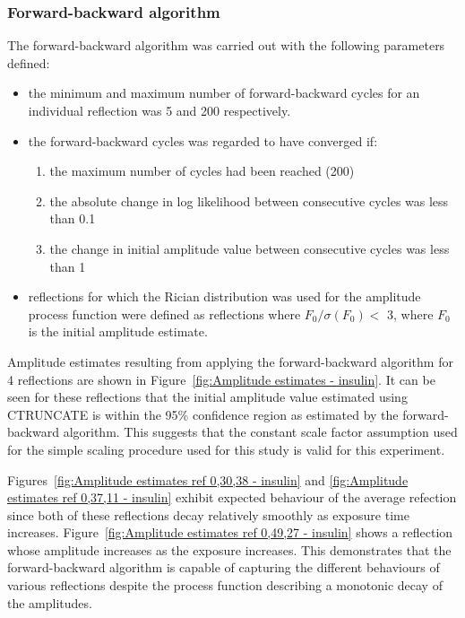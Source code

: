 \subsubsection{Forward-backward algorithm}
\label{subs:Forward-backward algorithm - insulin}
The forward-backward algorithm was carried out with the following parameters defined:
\begin{itemize}
    \item the minimum and maximum number of forward-backward cycles for an individual reflection was 5 and 200 respectively.
    \item the forward-backward cycles was regarded to have converged if:
    \begin{enumerate}
        \item the maximum number of cycles had been reached (200)
        \item the absolute change in log likelihood between consecutive cycles was less than 0.1
        \item the change in initial amplitude value between consecutive cycles was less than 1
    \end{enumerate}
    \item reflections for which the Rician distribution was used for the amplitude process function were defined as reflections where $F_0/\sigma(F_0) <$ 3, where $F_0$ is the initial amplitude estimate.
\end{itemize}
Amplitude estimates resulting from applying the forward-backward algorithm for 4 reflections are shown in Figure~\ref{fig:Amplitude estimates - insulin}.
It can be seen for these reflections that the initial amplitude value estimated using CTRUNCATE is within the 95\% confidence region as estimated by the forward-backward algorithm.
This suggests that the constant scale factor assumption used for the simple scaling procedure used for this study is valid for this experiment.

Figures~\ref{fig:Amplitude estimates ref 0,30,38 - insulin} and \ref{fig:Amplitude estimates ref 0,37,11 - insulin} exhibit expected behaviour of the average refection since both of these reflections decay relatively smoothly as exposure time increases.
Figure~\ref{fig:Amplitude estimates ref 0,49,27 - insulin} shows a reflection whose amplitude increases as the exposure increases.
This demonstrates that the forward-backward algorithm is capable of capturing the different behaviours of various reflections despite the process function describing a monotonic decay of the amplitudes.

